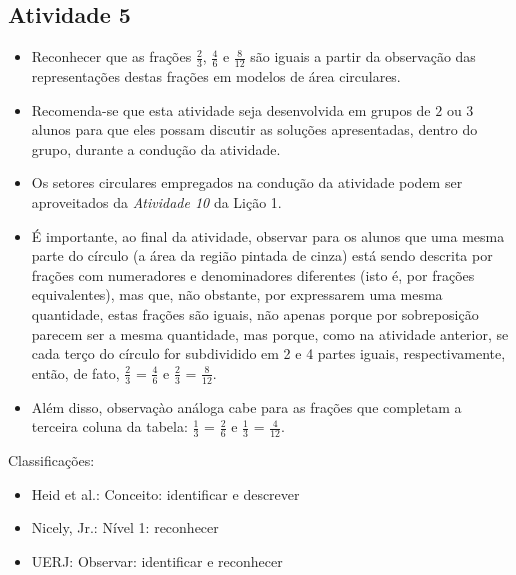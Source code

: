 \begin{multicols}{2}
\Bg

\subsection{Atividade 5}

\begin{itemize} %
    \item       Reconhecer que as frações       $\frac{2}{3}$,       
$\frac{4}{6}$       e       $\frac{8}{12}$       são iguais a partir da 
observação das representações destas frações em modelos de área circulares. 
\end{itemize} %
  
 
\begin{itemize} %
    \item       Recomenda-se que esta atividade seja desenvolvida em grupos de   
    $2$       ou       $3$       alunos para que eles possam discutir as 
soluções apresentadas, dentro do grupo, durante a condução da atividade.
    \item       Os setores circulares empregados na condução da atividade podem 
ser aproveitados da \emph{Atividade 10}       da Lição 1.
    \item       É importante, ao final da atividade, observar para os alunos que 
uma mesma parte do círculo (a área da região pintada de cinza) está sendo 
descrita por frações com numeradores e denominadores diferentes (isto é, por 
frações equivalentes), mas que, não obstante, por expressarem uma mesma 
quantidade, estas frações são iguais, não apenas porque por sobreposição parecem 
ser a mesma quantidade, mas porque, como na atividade anterior, se cada terço do 
círculo for subdividido em 2 e 4 partes iguais, respectivamente, então, de fato, 
      $\frac{2}{3}$       =       $\frac{4}{6}$       e       $\frac{2}{3}$      
 =       $\frac{8}{12}$.
    \item       Além disso, observaçào análoga cabe para as frações que 
completam a terceira coluna da tabela:       $\frac{1}{3}$       =       
$\frac{2}{6}$       e       $\frac{1}{3}$       =       $\frac{4}{12}$.
\end{itemize} %
  
  Classificações:  
\begin{itemize} %
    \item       Heid et al.: Conceito: identificar e descrever
    \item       Nicely, Jr.: Nível 1: reconhecer
    \item       UERJ: Observar: identificar e reconhecer
\end{itemize} %


\end{multicols}
